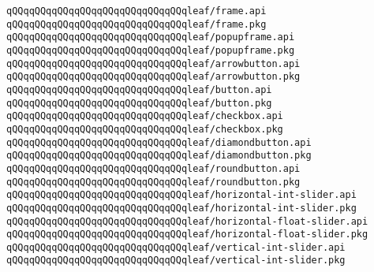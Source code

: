 \newline
\verb|qQQqqQQqqQQqqQQqqQQqqQQqqQQqqQQqleaf/frame.api|\newline
\verb|qQQqqQQqqQQqqQQqqQQqqQQqqQQqqQQqleaf/frame.pkg|\newline
\newline
\verb|qQQqqQQqqQQqqQQqqQQqqQQqqQQqqQQqleaf/popupframe.api|\newline
\verb|qQQqqQQqqQQqqQQqqQQqqQQqqQQqqQQqleaf/popupframe.pkg|\newline
\newline
\verb|qQQqqQQqqQQqqQQqqQQqqQQqqQQqqQQqleaf/arrowbutton.api|\newline
\verb|qQQqqQQqqQQqqQQqqQQqqQQqqQQqqQQqleaf/arrowbutton.pkg|\newline
\newline
\verb|qQQqqQQqqQQqqQQqqQQqqQQqqQQqqQQqleaf/button.api|\newline
\verb|qQQqqQQqqQQqqQQqqQQqqQQqqQQqqQQqleaf/button.pkg|\newline
\newline
\verb|qQQqqQQqqQQqqQQqqQQqqQQqqQQqqQQqleaf/checkbox.api|\newline
\verb|qQQqqQQqqQQqqQQqqQQqqQQqqQQqqQQqleaf/checkbox.pkg|\newline
\newline
\verb|qQQqqQQqqQQqqQQqqQQqqQQqqQQqqQQqleaf/diamondbutton.api|\newline
\verb|qQQqqQQqqQQqqQQqqQQqqQQqqQQqqQQqleaf/diamondbutton.pkg|\newline
\newline
\verb|qQQqqQQqqQQqqQQqqQQqqQQqqQQqqQQqleaf/roundbutton.api|\newline
\verb|qQQqqQQqqQQqqQQqqQQqqQQqqQQqqQQqleaf/roundbutton.pkg|\newline
\newline
\verb|qQQqqQQqqQQqqQQqqQQqqQQqqQQqqQQqleaf/horizontal-int-slider.api|\newline
\verb|qQQqqQQqqQQqqQQqqQQqqQQqqQQqqQQqleaf/horizontal-int-slider.pkg|\newline
\newline
\verb|qQQqqQQqqQQqqQQqqQQqqQQqqQQqqQQqleaf/horizontal-float-slider.api|\newline
\verb|qQQqqQQqqQQqqQQqqQQqqQQqqQQqqQQqleaf/horizontal-float-slider.pkg|\newline
\newline
\verb|qQQqqQQqqQQqqQQqqQQqqQQqqQQqqQQqleaf/vertical-int-slider.api|\newline
\verb|qQQqqQQqqQQqqQQqqQQqqQQqqQQqqQQqleaf/vertical-int-slider.pkg|\newline
